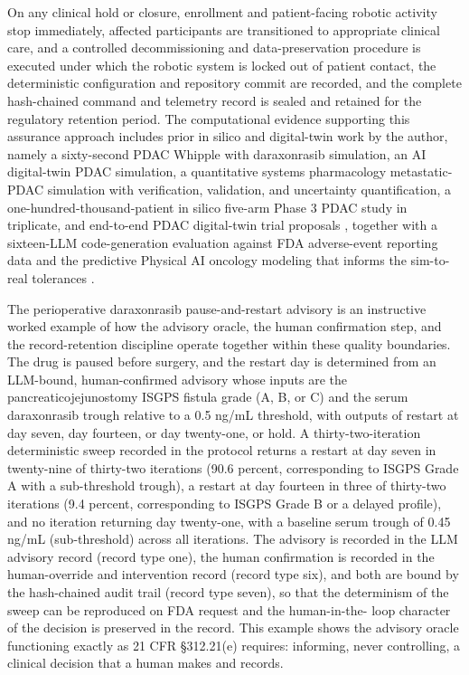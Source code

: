On any clinical hold or closure, enrollment and patient-facing robotic activity stop
immediately, affected participants are transitioned to appropriate clinical care,
and a controlled decommissioning and data-preservation procedure is executed under
which the robotic system is locked out of patient contact, the deterministic
configuration and repository commit are recorded, and the complete hash-chained
command and telemetry record is sealed and retained for the regulatory retention
period. The computational evidence supporting this assurance approach includes prior
in silico and digital-twin work by the author, namely a sixty-second PDAC Whipple
with daraxonrasib simulation, an AI digital-twin PDAC simulation, a quantitative
systems pharmacology metastatic-PDAC simulation with verification, validation, and
uncertainty quantification, a one-hundred-thousand-patient in silico five-arm Phase 3
PDAC study in triplicate, and end-to-end PDAC digital-twin trial proposals
\cite{qspmetpancre,fdadigtwinpc,chatgpt100kp,pdacdigtwinp}, together with a
sixteen-LLM code-generation evaluation against FDA adverse-event reporting data
\cite{llmcomp16fda} and the predictive Physical AI oncology modeling that informs the
sim-to-real tolerances \cite{paipredict4x}.

The perioperative daraxonrasib pause-and-restart advisory is an instructive worked
example of how the advisory oracle, the human confirmation step, and the
record-retention discipline operate together within these quality boundaries. The
drug is paused before surgery, and the restart day is determined from an
LLM-bound, human-confirmed advisory whose inputs are the pancreaticojejunostomy
ISGPS fistula grade (A, B, or C) and the serum daraxonrasib trough relative to a
0.5 ng/mL threshold, with outputs of restart at day seven, day fourteen, or day
twenty-one, or hold. A thirty-two-iteration deterministic sweep recorded in the
protocol returns a restart at day seven in twenty-nine of thirty-two iterations
(90.6 percent, corresponding to ISGPS Grade A with a sub-threshold trough), a restart
at day fourteen in three of thirty-two iterations (9.4 percent, corresponding to
ISGPS Grade B or a delayed profile), and no iteration returning day twenty-one, with
a baseline serum trough of 0.45 ng/mL (sub-threshold) across all iterations. The
advisory is recorded in the LLM advisory record (record type one), the human
confirmation is recorded in the human-override and intervention record (record type
six), and both are bound by the hash-chained audit trail (record type seven), so that
the determinism of the sweep can be reproduced on FDA request and the human-in-the-
loop character of the decision is preserved in the record. This example shows the
advisory oracle functioning exactly as 21 CFR \S 312.21(e) requires: informing, never
controlling, a clinical decision that a human makes and records.

